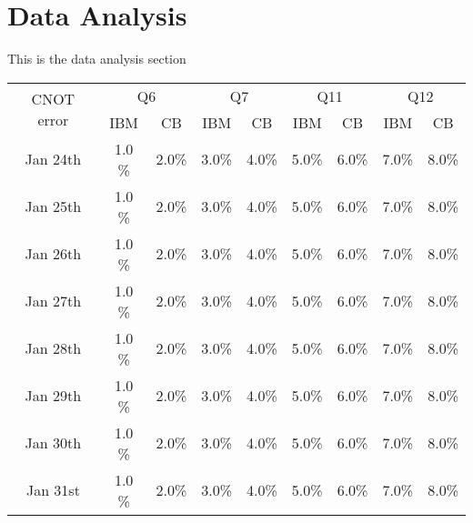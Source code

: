 
\section{Data Analysis}
This is the data analysis section

\begin{table}
  \begin{tabular}{|c|c|c|c|c|c|c|c|c|}
    \hline
    \multirow{2}{*}{CNOT error} &
      \multicolumn{2}{|c}{Q6} &
      \multicolumn{2}{|c}{Q7} &
      \multicolumn{2}{|c}{Q11} &
      \multicolumn{2}{|c|}{Q12} \\
    & IBM & CB & IBM & CB & IBM & CB & IBM & CB \\
    \hline
    Jan 24th  & 1.0 \% & 2.0\% & 3.0\% & 4.0\% & 5.0\% & 6.0\% & 7.0\% & 8.0\%    \\
    \hline
    Jan 25th  & 1.0 \% & 2.0\% & 3.0\% & 4.0\% & 5.0\% & 6.0\% & 7.0\% & 8.0\%    \\
    \hline
    Jan 26th  & 1.0 \% & 2.0\% & 3.0\% & 4.0\% & 5.0\% & 6.0\% & 7.0\% & 8.0\%    \\
    \hline
    Jan 27th  & 1.0 \% & 2.0\% & 3.0\% & 4.0\% & 5.0\% & 6.0\% & 7.0\% & 8.0\%    \\
    \hline
    Jan 28th  & 1.0 \% & 2.0\% & 3.0\% & 4.0\% & 5.0\% & 6.0\% & 7.0\% & 8.0\%    \\
    \hline
    Jan 29th  & 1.0 \% & 2.0\% & 3.0\% & 4.0\% & 5.0\% & 6.0\% & 7.0\% & 8.0\%    \\
    \hline
     Jan 30th  & 1.0 \% & 2.0\% & 3.0\% & 4.0\% & 5.0\% & 6.0\% & 7.0\% & 8.0\%    \\
    \hline
    Jan 31st  & 1.0 \% & 2.0\% & 3.0\% & 4.0\% & 5.0\% & 6.0\% & 7.0\% & 8.0\%    \\
    \hline
  \end{tabular}
\end{table}
